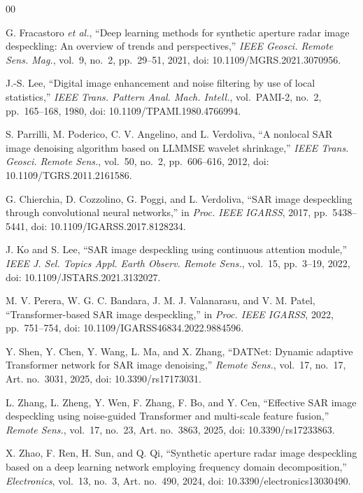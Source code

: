 \documentclass[conference]{IEEEtran}
\begin{document}
\begin{thebibliography}{00}

G. Fracastoro \emph{et al.}, ``Deep learning methods for synthetic aperture radar image despeckling: An overview of trends and perspectives,'' \emph{IEEE Geosci. Remote Sens. Mag.}, vol.~9, no.~2, pp.~29--51, 2021, doi: 10.1109/MGRS.2021.3070956.

J.-S. Lee, ``Digital image enhancement and noise filtering by use of local statistics,'' \emph{IEEE Trans. Pattern Anal. Mach. Intell.}, vol.~PAMI-2, no.~2, pp.~165--168, 1980, doi: 10.1109/TPAMI.1980.4766994.

S. Parrilli, M. Poderico, C. V. Angelino, and L. Verdoliva, ``A nonlocal SAR image denoising algorithm based on LLMMSE wavelet shrinkage,'' \emph{IEEE Trans. Geosci. Remote Sens.}, vol.~50, no.~2, pp.~606--616, 2012, doi: 10.1109/TGRS.2011.2161586.

G. Chierchia, D. Cozzolino, G. Poggi, and L. Verdoliva, ``SAR image despeckling through convolutional neural networks,'' in \emph{Proc. IEEE IGARSS}, 2017, pp.~5438--5441, doi: 10.1109/IGARSS.2017.8128234.

J. Ko and S. Lee, ``SAR image despeckling using continuous attention module,'' \emph{IEEE J. Sel. Topics Appl. Earth Observ. Remote Sens.}, vol.~15, pp.~3--19, 2022, doi: 10.1109/JSTARS.2021.3132027.

M. V. Perera, W. G. C. Bandara, J. M. J. Valanarasu, and V. M. Patel, ``Transformer-based SAR image despeckling,'' in \emph{Proc. IEEE IGARSS}, 2022, pp.~751--754, doi: 10.1109/IGARSS46834.2022.9884596.

Y. Shen, Y. Chen, Y. Wang, L. Ma, and X. Zhang, ``DATNet: Dynamic adaptive Transformer network for SAR image denoising,'' \emph{Remote Sens.}, vol.~17, no.~17, Art. no.~3031, 2025, doi: 10.3390/rs17173031.

L. Zhang, L. Zheng, Y. Wen, F. Zhang, F. Bo, and Y. Cen, ``Effective SAR image despeckling using noise-guided Transformer and multi-scale feature fusion,'' \emph{Remote Sens.}, vol.~17, no.~23, Art. no.~3863, 2025, doi: 10.3390/rs17233863.

X. Zhao, F. Ren, H. Sun, and Q. Qi, ``Synthetic aperture radar image despeckling based on a deep learning network employing frequency domain decomposition,'' \emph{Electronics}, vol.~13, no.~3, Art. no.~490, 2024, doi: 10.3390/electronics13030490.


\end{thebibliography}
\end{document}
